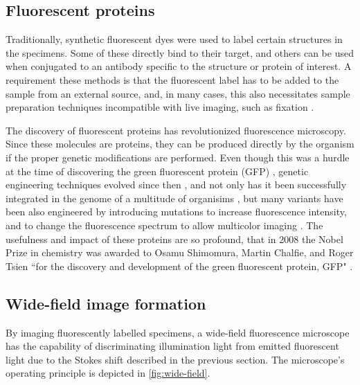 

  \subsection{Fluorescent proteins}
    Traditionally, synthetic fluorescent dyes were used to label certain structures in the specimens. Some of these directly bind to their target,
    and others can be used when conjugated to an antibody specific to the structure or protein of interest. A requirement these methods is that the fluorescent label has to be added to the sample from an external source, and, in many cases, this also necessitates sample preparation techniques incompatible with live imaging, such as fixation \cite{bacallao_guiding_1990}.

    The discovery of fluorescent proteins has revolutionized fluorescence microscopy. Since these molecules are proteins, they can be produced directly by the organism if the proper genetic modifications are performed. Even though this was a hurdle at the time of discovering the green fluorescent protein (GFP) \cite{shimomura_extraction_1962}, genetic engineering techniques evolved since then \cite{prasher_primary_1992}, and not only has it been successfully integrated in the genome of a multitude of organisims \cite{chalfie_green_1994,amsterdam_aequorea_1995,okabe_green_1997}, but many variants have been also engineered by introducing mutations to increase fluorescence intensity, and to change the fluorescence spectrum to allow multicolor imaging \cite{heim_wavelength_1994,heim_engineering_1996,cormack_facs-optimized_1996,okabe_green_1997}. The usefulness and impact of these proteins are so profound, that in 2008 the Nobel Prize in chemistry was awarded to Osamu Shimomura, Martin Chalfie, and Roger Tsien ``for the discovery and development of the green fluorescent protein, GFP" \cite{service_three_2008}.


  \subsection{Wide-field image formation}
    By imaging fluorescently labelled specimens, a wide-field fluorescence microscope has the capability of discriminating illumination light from emitted fluorescent light due to the Stokes shift described in the previous section. The microscope's operating principle is depicted in \autoref{fig:wide-field}.

